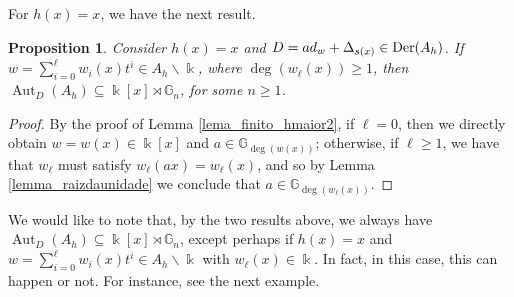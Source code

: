 \documentclass{article}
\numberwithin{equation}{section}\theoremstyle{plain}
\newtheorem{proposition}[theorem]{Proposition}
\newcommand{\der}{{\rm Der}}
\DeclareMathOperator{\Aut}{Aut}
\begin{document}
For $h(x)=x$, we have the next result.
\begin{proposition}\label{lema_finito_h_igual_x}
    Consider $h(x)=x$ and $D=ad_w+\Delta_{s(x)} \in \der(A_h)$. 
    If $w=\sum_{i=0}^\ell w_i(x) t^i\in A_h\backslash \Bbbk$, where $\deg(w_\ell(x)) \geq 1$, then  $\Aut_D(A_h) \subseteq \Bbbk[x] \rtimes \mathbb{G}_n$, for some $n \geq 1$.
\end{proposition}
\begin{proof}
By the proof of Lemma \ref{lema_finito_hmaior2}, if $\ell = 0$, then we directly obtain $w =w(x) \in \Bbbk[x]$ and $a \in \mathbb{G}_{\deg(w(x))}$; otherwise, if $\ell \geq 1$, we have that $w_\ell$ must satisfy $w_\ell(ax) = w_\ell(x)$, and so by Lemma \ref{lemma_raizdaunidade} we conclude that $a \in \mathbb{G}_{\deg(w_\ell(x))}$.
\end{proof}

We would like to note that, by the two results above, we always have $\Aut_D (A_h) \subseteq \Bbbk[x] \rtimes \mathbb{G}_n$, except perhaps if $h(x)=x$ and $w=\sum_{i=0}^\ell w_i(x) t^i\in A_h\backslash \Bbbk$ with $w_\ell(x) \in \Bbbk$.
In fact, in this case, this can happen or not. For instance, see the next example.
\end{document}
